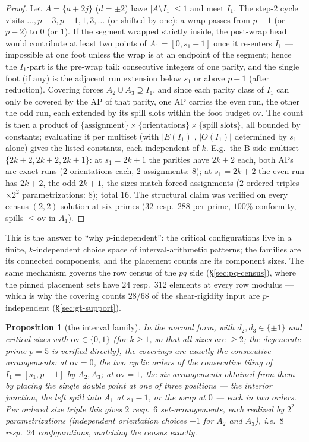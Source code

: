 \documentclass[11pt,a4paper]{article}
\numberwithin{equation}{section}
\theoremstyle{plain}
\theoremstyle{plain}
\newtheorem{proposition}[theorem]{Proposition}
\theoremstyle{definition}
\theoremstyle{remark}
\begin{document}
\begin{proof}
Let $A=\{a+2j\}$ ($d=\pm2$) have $|A\setminus I_1|\le1$ and meet $I_1$.
The step-$2$ cycle visits $\dots,p{-}3,p{-}1,1,3,\dots$ (or shifted by
one): a wrap passes from $p-1$ (or $p-2$) to $0$ (or $1$). If the segment
wrapped strictly inside, the post-wrap head would contribute at least two
points of $A_1=[0,s_1-1]$ once it re-enters $I_1$ --- impossible at one
foot unless the wrap is at an endpoint of the segment; hence the $I_1$-part
is the pre-wrap tail: consecutive integers of one parity, and the single
foot (if any) is the adjacent run extension below $s_1$ or above $p-1$
(after reduction). Covering forces $A_2\cup A_3\supseteq I_1$, and since
each parity class of $I_1$ can only be covered by the AP of that parity,
one AP carries the even run, the other the odd run, each extended by its
spill slots within the foot budget $\mathrm{ov}$. The count is then a
product of $\{\text{assignment}\}\times\{\text{orientations}\}\times
\{\text{spill slots}\}$, all bounded by constants; evaluating it per
multiset (with $|E(I_1)|$, $|O(I_1)|$ determined by $s_1$ alone) gives the
listed constants, each independent of $k$. E.g.\ the B-side multiset
$\{2k{+}2,2k{+}2,2k{+}1\}$: at $s_1=2k{+}1$ the parities have $2k{+}2$
each, both APs are exact runs ($2$ orientations each, $2$ assignments:
$8$); at $s_1=2k{+}2$ the even run has $2k{+}2$, the odd $2k{+}1$, the
sizes match forced assignments ($2$ ordered triples $\times2^2$
parametrizations: $8$); total $16$. The structural claim was verified on
every census $(2,2)$ solution at six primes ($32$ resp.\ $288$ per prime,
$100\%$ conformity, spills $\le\mathrm{ov}$ in $A_1$).
\end{proof}

This is the answer to ``why $p$-independent'': the critical configurations
live in a finite, $k$-independent choice space of interval-arithmetic
patterns; the families are its connected components, and the placement
counts are its component sizes. The same mechanism governs the row census
of the $pq$ side (\S\ref{sec:pq-census}), where the pinned placement sets
have $24$ resp.\ $312$ elements at every row modulus --- which is why the
covering counts $28/68$ of the shear-rigidity input are $p$-independent
(\S\ref{sec:gt-support}).

\begin{proposition}[the interval family]\label{prop:F1}
In the normal form, with $d_2,d_3\in\{\pm1\}$ and critical sizes with
$\mathrm{ov}\in\{0,1\}$ (for $k\ge1$, so that all sizes are $\ge2$; the
degenerate prime $p=5$ is verified directly), the coverings are exactly the consecutive
arrangements: at $\mathrm{ov}=0$, the two cyclic orders of the consecutive
tiling of $I_1=[s_1,p-1]$ by $A_2,A_3$; at $\mathrm{ov}=1$, the six
arrangements obtained from them by placing the single double point at one of
three positions --- the interior junction, the left spill into $A_1$ at
$s_1-1$, or the wrap at $0$ --- each in two orders. Per ordered size triple
this gives $2$ resp.\ $6$ set-arrangements, each realized by $2^2$
parametrizations (independent orientation choices $\pm1$ for $A_2$ and
$A_3$), i.e.\ $8$ resp.\ $24$ configurations, matching the census exactly.
\end{proposition}
\end{document}
